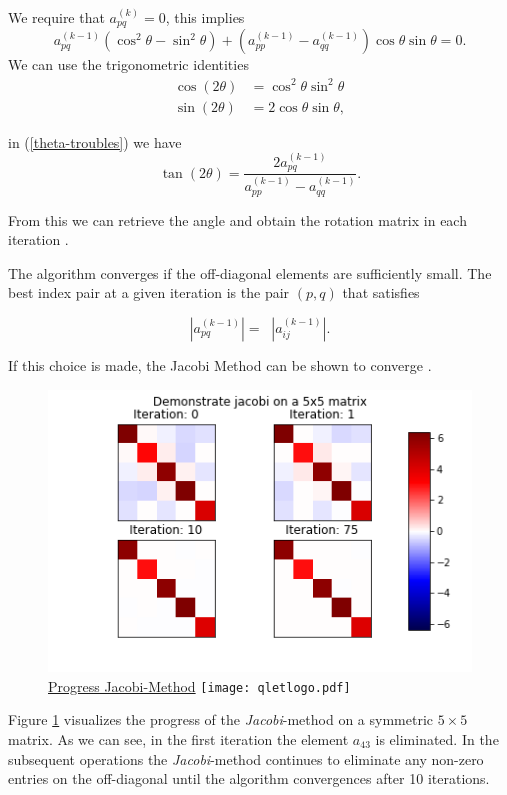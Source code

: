 \documentclass[12pt]{article}
\begin{document}
We require that $a_{pq}^{(k)} = 0$, this implies
\begin{equation}
\label{theta-troubles}
a^{(k-1)}_{pq} (\cos^2\theta - \sin^2\theta) + \left( a^{(k-1)}_{pp} - a^{(k-1)}_{qq} \right) \cos\theta \sin\theta = 0.
\end{equation}
We can use the trigonometric identities
\begin{align*}
\cos(2\theta) &= \cos^2 \theta \sin^2 \theta \\
\sin(2\theta) &= 2 \cos\theta \sin\theta,
\end{align*}

in (\ref{theta-troubles}) we have
$$\tan(2\theta) = \frac{2a^{(k-1)}_{pq}}{a^{(k-1)}_{pp} - a^{(k-1)}_{qq}}.$$

From this we can retrieve the angle and obtain the rotation matrix in each iteration \citep{NLA}.

The algorithm converges if the off-diagonal elements are sufficiently small. The best index pair at a given iteration is the pair $(p, q)$ that satisfies

\[
|a^{(k-1)}_{pq}| = \mathop{\max_{i<j}} |a^{(k-1)}_{ij}|.
\]

If this choice is made, the Jacobi Method can be shown to converge \citep{NLA}.

\begin{figure}[H]
\begin{center}
\caption{\href {https://github.com/thsis/NIS18/tree/master/media/plots}{Progress Jacobi-Method}  \protect\texttt{[image: qletlogo.pdf]}}
  \label{j-plot}
  \includegraphics[scale=0.6]{../media/plots/jacobi.png}
\end{center}
\end{figure}


Figure \ref{j-plot} visualizes the progress of the \textit{Jacobi}-method on a symmetric $5 \times 5$ matrix. As we can see, in the first iteration the element $a_{43}$ is eliminated. In the subsequent operations the \textit{Jacobi}-method continues to eliminate any non-zero entries on the off-diagonal until the algorithm convergences after 10 iterations.
\end{document}
